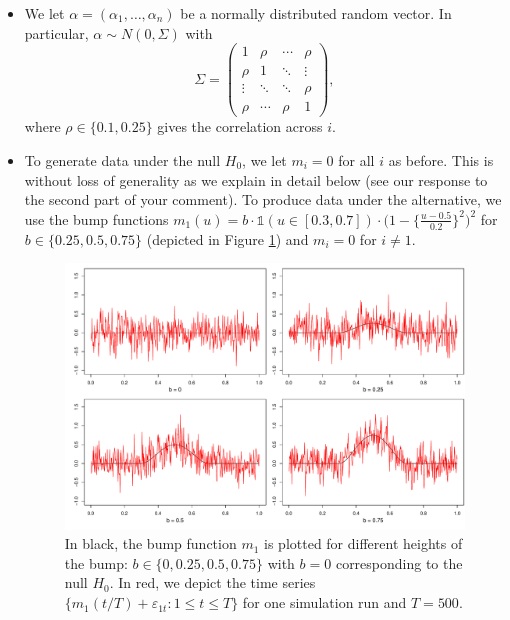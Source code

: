 \documentclass[a4paper,12pt]{article}
\begin{document}
\begin{enumerate}[label=\arabic*.,leftmargin=0.6cm]
\begin{enumerate}[label=(\roman*),leftmargin=0.75cm,topsep=0pt]
\begin{itemize}[leftmargin=0.45cm,itemsep=0pt,topsep=0pt]
\item We let $\alpha = (\alpha_1,\ldots,\alpha_n)$ be a normally distributed random vector. In particular, $\alpha \sim N(0,\Sigma)$ with
\[ \Sigma =
\begin{pmatrix}
1      & \rho   & \cdots & \rho   \\
\rho   & 1      & \ddots & \vdots \\
\vdots & \ddots & \ddots & \rho   \\
\rho   & \cdots & \rho   & 1
\end{pmatrix},
\]
where $\rho \in \{0.1, 0.25\}$ gives the correlation across $i$.

\item To generate data under the null $H_0$, we let $m_i = 0$ for all $i$ as before. This is without loss of generality as we explain in detail below (see our response to the second part of your comment). To produce data under the alternative, we use the bump functions $m_1(u) = b \cdot \mathbb{1}(u \in [0.3, 0.7]) \cdot \big(1 - \big\{\frac{u - 0.5}{0.2}\big\}^2\big)^2$ for $b \in \{ 0.25, 0.5, 0.75 \}$ (depicted in Figure \ref{fig:bump_function}) and $m_i = 0$ for $i \neq 1$.

\begin{figure}[t!]
\includegraphics[width=\textwidth]{../output/bump_function.pdf}
\caption{In black, the bump function $m_1$ is plotted for different heights of the bump: $b \in \{0, 0.25, 0.5, 0.75\}$ with $b=0$ corresponding to the null $H_0$. In red, we depict the time series $\{m_1(t/T) + \varepsilon_{1t}: 1 \le t \le T\}$ for one simulation run and $T=500$.}\label{fig:bump_function}

\end{figure}


\end{itemize}
\end{enumerate}
\end{enumerate}
\end{document}

